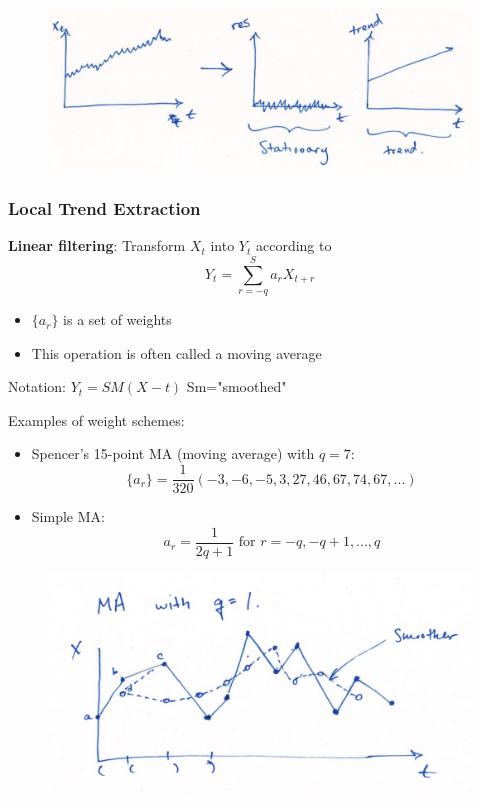 \begin{figure}[h]
\includegraphics[scale=0.3]{images/Screenshot 2024-03-29 at 16.08.14.jpg}
\centering
\end{figure}

\subsubsection{Local Trend Extraction}



\textbf{Linear filtering}: Transform $X_t$ into $Y_t$ according to $$Y_t = \sum_{r=-q}^S a_rX_{t+r}$$

\begin{itemize}
    \item $\{a_r\}$ is a set of weights
    \item This operation is often called a moving average
\end{itemize}

Notation: \quad $Y_t=SM(X-t)$ \quad Sm="smoothed"

Examples of weight schemes:
\begin{itemize}
    \item Spencer's 15-point MA (moving average) with $q=7$:
    $$\{a_r\}=\frac{1}{320}(-3,-6,-5,3,27,46,67,74,67,...)$$
    \item Simple MA:
    $$a_r=\frac{1}{2q+1} \text{ for } r=-q,-q+1,...,q$$ 
\end{itemize}


\begin{figure}[h]
\includegraphics[scale=0.3]{images/Screenshot 2024-03-30 at 14.22.35.jpg}
\centering
\end{figure}


